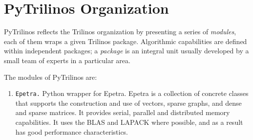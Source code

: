 \documentclass[10pt,relax]{SANDreport}
\begin{document}
\section{PyTrilinos Organization}
\label{sec:organization}

PyTrilinos reflects the Trilinos organization by presenting
a series of {\sl modules}, each of them wraps a given Trilinos package.
Algorithmic capabilities are defined within independent packages; a {\sl
  package} is an integral unit usually developed by a small team of experts in
  a particular area. 

The modules of PyTrilinos are:
\begin{enumerate}
\item {\tt Epetra.} Python wrapper for Epetra. Epetra is a collection
of concrete classes that supports the construction and use of vectors, sparse
graphs, and dense and sparse matrices. It provides serial, parallel and
distributed memory capabilities. It uses the BLAS and LAPACK where possible,
  and as a result has good performance characteristics.


\end{enumerate}
\end{document}
